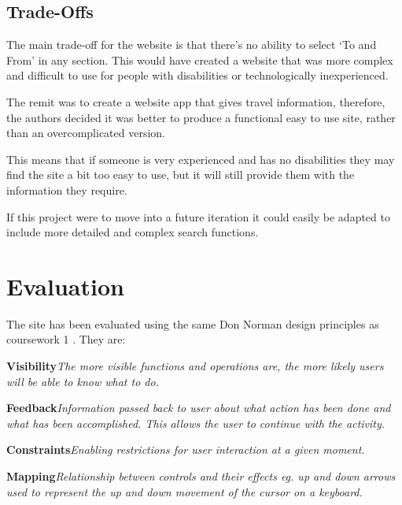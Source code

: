 \documentclass{ueacmpstyle}
\renewcommand{\paragraph}[1]{\par\textbf{#1}\hspace{0.3em}}
\begin{document}
{{\subsection{Trade-Offs}
The main trade-off for the website is that there's no ability to select `To and From' in any section. This would have created a website that was more complex and difficult to use for people with disabilities or technologically inexperienced. 

The remit was to create a website app that gives travel information, therefore, the authors decided it was better to produce a functional easy to use site, rather than an overcomplicated version. 

This means that if someone is very experienced and has no disabilities they may find the site a bit too easy to use, but it will still provide them with the information they require.

If this project were to move into a future iteration it could easily be adapted to include more detailed and complex search functions.

\section{Evaluation}

The site has been evaluated using the same Don Norman design principles as coursework 1 \citep{rogers2011interaction}. They are:

\paragraph {Visibility}\textit{The more visible functions and operations are, the more likely users will be able to know what to do.}
\paragraph{Feedback}\textit{Information passed back to user about what action has been done and what has been accomplished. This allows the user to continue with the activity.} 
\paragraph{Constraints}\textit{Enabling restrictions for user interaction at a given moment.} 
\paragraph{Mapping}\textit{Relationship between controls and their effects eg. up and down arrows used to represent the up and down movement of the cursor on a keyboard.}
}}
\end{document}
